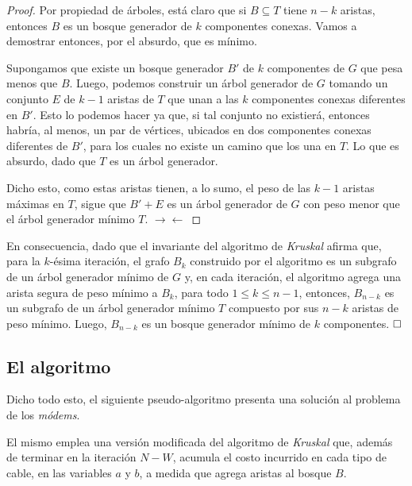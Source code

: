 \begin{proof}
Por propiedad de árboles, está claro que si $B \subseteq T$ tiene $n - k$ aristas, entonces $B$ es un bosque generador de $k$ componentes conexas. Vamos a demostrar entonces, por el absurdo, que es mínimo.

Supongamos que existe un bosque generador $B'$ de $k$ componentes de $G$ que pesa menos que $B$. Luego, podemos construir un árbol generador de $G$ tomando un conjunto $E$ de $k-1$ aristas de $T$ que unan a las $k$ componentes conexas diferentes en $B'$. Esto lo podemos hacer ya que, si tal conjunto no existierá, entonces habría, al menos, un par de vértices, ubicados en dos componentes conexas diferentes de $B'$, para los cuales no existe un camino que los una en $T$. Lo que es absurdo, dado que $T$ es un árbol generador.

Dicho esto, como estas aristas tienen, a lo sumo, el peso de las $k-1$ aristas máximas en $T$, sigue que $B' + E$ es un árbol generador de $G$ con peso menor que el árbol generador mínimo $T$. $\rightarrow\leftarrow$  
\end{proof}
En consecuencia, dado que el invariante del algoritmo de \textit{Kruskal} afirma que, para la $k$-ésima iteración, el grafo $B_k$ construido por el algoritmo es un subgrafo de un árbol generador mínimo de $G$ y, en cada iteración, el algoritmo agrega una arista segura de peso mínimo a $B_k$, para todo $1 \leq k \leq n-1$, entonces, $B_{n-k}$ es un subgrafo de un árbol generador mínimo $T$ compuesto por sus $n-k$ aristas de peso mínimo. Luego, $B_{n-k}$ es un bosque generador mínimo de $k$ componentes. $\hfill \square$

\subsection{El algoritmo} Dicho todo esto, el siguiente pseudo-algoritmo presenta una solución al problema de los \textit{módems}. %



El mismo emplea una versión modificada del algoritmo de \textit{Kruskal} que, además de terminar en la iteración $N - W$, acumula el costo incurrido en cada tipo de cable, en las variables $a$ y $b$, a medida que agrega aristas al bosque $B$. %

